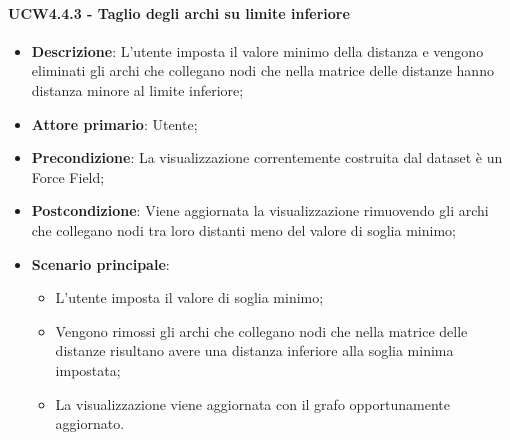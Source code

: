 \paragraph{UCW4.4.3 - Taglio degli archi su limite inferiore}
\label{par:ucw4.4.3}
\begin{itemize}
    \item \textbf{Descrizione}:     L'utente imposta il valore minimo della distanza e vengono eliminati gli archi che collegano nodi che nella matrice delle distanze hanno distanza minore al limite inferiore;
    \item \textbf{Attore primario}: Utente;
    \item \textbf{Precondizione}:   La visualizzazione correntemente costruita dal dataset è un Force Field;
    \item \textbf{Postcondizione}:  Viene aggiornata la visualizzazione rimuovendo gli archi  che collegano nodi tra loro distanti meno del valore di soglia minimo;
    \item \textbf{Scenario principale}:
    \begin{itemize}
        \item L'utente imposta il valore di soglia minimo;
        \item Vengono rimossi gli archi che collegano nodi che nella matrice delle distanze risultano avere una distanza inferiore alla soglia minima impostata;
        \item La visualizzazione viene aggiornata con il grafo opportunamente aggiornato.
    \end{itemize}
\end{itemize}

